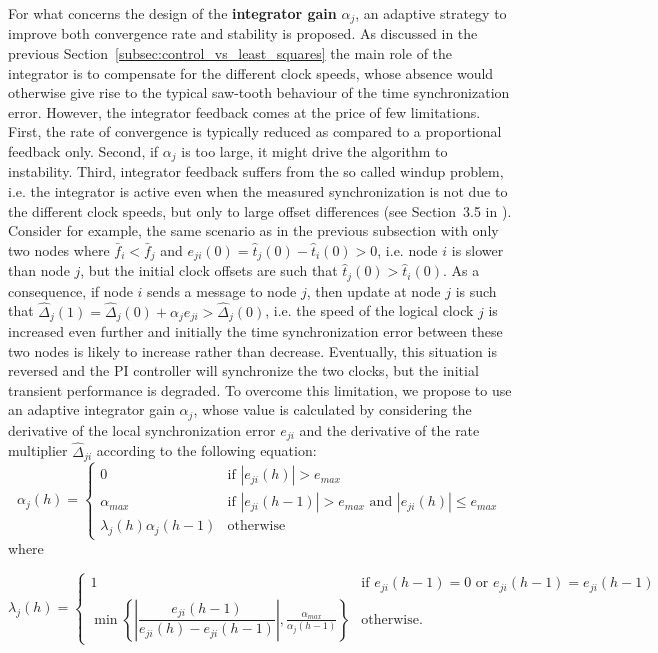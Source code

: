 \documentclass[english,a4paper,10pt,final]{article}
\numberwithin{equation}{section}
\numberwithin{figure}{section}
\begin{document}
For what concerns the design of the \textbf{integrator gain} $\alpha_j$, an adaptive strategy to improve both convergence rate and stability is proposed. As discussed in the previous Section~\ref{subsec:control_vs_least_squares} the main role of the integrator is to compensate for the different clock speeds, whose absence would otherwise give rise to the typical saw-tooth behaviour of the time synchronization error. However, the integrator feedback comes at the price of few limitations. First, the rate of convergence is typically reduced as compared to a proportional feedback only. Second, if $\alpha_j$ is too large, it might drive the algorithm to instability. Third, integrator feedback suffers from the so called windup problem, i.e. the integrator is active even when the measured synchronization is not due to the different clock speeds, but only to large offset differences (see Section~3.5 in \cite{Astrom:95}). Consider for example, the same scenario as in the previous subsection with only two nodes where $\bar f_i<\bar f_j$ and $ e_{ji}(0)=\hat{t}_{j}(0)-\hat{t}_{i}(0)>0$, i.e. node $i$ is slower than node $j$, but the initial clock offsets are such that $\hat{t}_j(0)>\hat t_i(0)$. As a consequence, if node $i$ sends a message to node $j$, then update at node $j$ is such that $\hat \Delta_j(1) = \hat \Delta_j(0)+\alpha_j e_{ji} >  \hat \Delta_j(0)$, i.e. the speed of the logical clock $j$ is increased even further and initially the time synchronization error between these two nodes is likely to increase rather than decrease. Eventually, this situation is reversed and the PI controller will synchronize the two clocks, but the initial transient performance is degraded. To overcome this limitation, we propose to use an adaptive integrator gain $\alpha_j$, whose value is calculated by considering the derivative of the local synchronization error $e_{ji}$ and the derivative of the rate multiplier $\hat \Delta_{ji}$  according to the following equation:
\begin{equation} \label{eqn:new_adaptation_rule}
  \alpha_j(h) = 
  \begin{cases}
   	 0 & \mbox{if } |e_{ji}(h)|> e_{max} \\ 
	 \alpha_{max} & \mbox{if } |e_{ji}(h-1)| > e_{max} \mbox{ and }  |e_{ji}(h)| \leq e_{max}\\
	\lambda_j(h) \alpha_j(h-1) & \mbox{otherwise}
   \end{cases}    
\end{equation} where 

\begin{equation} \label{lambda}
	\lambda_j(h) = 
		\begin{cases}
    		1 & \mbox{if } e_{ji}(h-1)= 0 \mbox{ or }  e_{ji}(h-1) = e_{ji}(h-1)\\
	    	\min\left\{ \left|\dfrac{e_{ji}(h-1)}{e_{ji}(h)-e_{ji}(h-1)} \right|, 		\frac{\alpha_{max}}{\alpha_{j}(h-1)}\right\} & \mbox{otherwise}.
  \end{cases}    
\end{equation} 
\end{document}
